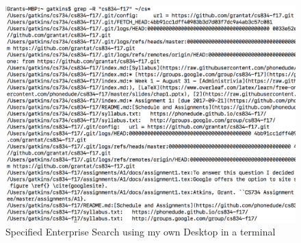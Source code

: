 \documentclass[letterpaper,11pt]{article}
\begin{document}
  \begin{figure}[h]
  \centering
  \includegraphics[scale=0.35]{grepsearch.png}
  \caption{Specified Enterprise Search using my own Desktop in a terminal}
  \label{fig:esearch2}
  \end{figure}

%
\end{document}
